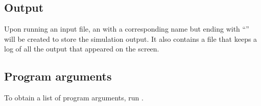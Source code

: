 \subsection{Output}


Upon running an input file, an  with a corresponding name but ending with ``'' will be created to store the simulation output. It also contains a file  that keeps a log of all the output that appeared on the screen.  


\subsection{Program arguments}\label{arguments}

To obtain a list of program arguments, run \prog {}.
